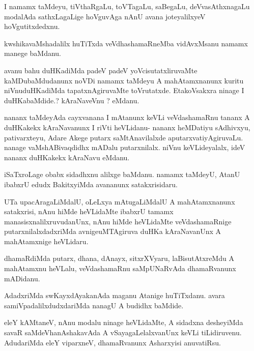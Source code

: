 \documentclass{article}
\begin{document}
\begin{mn}
I namamx  taMdeyu,  tiVthaRgaLu,  toVTagaLu,  saBegaLu,  deVvasAthxnagaLu 
 modalAda sathxLagaLige  hoVguvAga  nAnU  avana  joteyalilxyeV hoVgutitxdedxnu.
\end{mn}

\begin{mn}
kwshikavaMshadalilx huTiTxda veVdhashamaRneMba vidAvxMsanu namamx manege baMdanu.
\end{mn}

\begin{mn}
avanu bahu  duHKadiMda  padeV padeV  yoVcisutatxliruvaMte kaMDubaMdudanunx noVDi 
namamx taMdeyu A mahAtamxnanunx  kuritu  niVnuduHKadiMda tapatxnAgiruvaMte 
toVrutatxde.   EtakoVsakxra  ninage  I duHKabaMdide.? kAraNaveVnu ? eMdanu.
\end{mn}

\begin{mn}
nananx taMdeyAda  cayxvanana I mAtanunx keVLi  veVdashamaRnu  tananx A duHKakekx
 kAraNavanunx I riVti heVLidanu- nananx  heMDatiyu  sAdhivxyu, pativarxteyu,  
 Adare Akege  putarx saMtAnavilalxde  aputarxvatiyAgiruvaLu.  nanage 
 vaMshABivaqdidhx  mADalu  putarxnilalx. niVnu  keVLideyalalx,  ideV nananx 
 duHKakekx  kAraNavu  eMdanu.
\end{mn}

\begin{mn}
iSaTxroLage  obabx sidadhxnu alilxge baMdanu.  namamx  taMdeyU, AtanU ibabxrU 
edudx BakitxyiMda avananunx satakxrisidaru.
\end{mn}

\begin{mn}
UTa upacAragaLiMdalU, oLeLxya mAtugaLiMdalU  A mahAtamxnanunx satakxrisi, 
nAnu hiMde heVLidaMte ibabxrU  tamamx manasisxnalilxruvudanUnx, nAnu hiMde 
heVLidaMte veVdashamaRnige putarxnilalxdadxriMda avnigeuMTAgiruva duHKa 
kAraNavanUnx A mahAtamxnige heVLidaru. 
\end{mn}

\begin{mn}dhamaRdiMda putarx, dhana, dAnayx, sitxrXVyaru, laBisutAtxreMdu 
A mahAtamxnu heVLalu, veVdashamaRnu saMpUNaRvAda dhamaRvanunx mADidanu.
\end{mn}

\begin{mn}
AdadxriMda swKayxdAyakanAda maganu Atanige huTiTxdanu. avara samiVpadalilxdudxdariMda 
nanagU A budidhx baMdide.
\end{mn}

\begin{mn}
eleY  kAMtaneV, nAnu modalu ninage heVLidaMte, A sidadxna desheyiMda savaR 
saMdeVhanAshakavAda  A vSayagaLelalxvanUnx keVLi tiLidiruvenu. AdudariMda eleY 
viparxneV, dhamaRvanunx Asharxyisi anuvatiRsu.
\end{mn}
\end{document}
